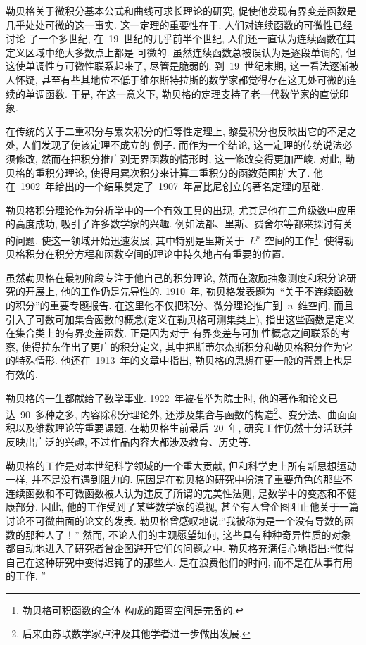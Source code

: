 勒贝格关于微积分基本公式和曲线可求长理论的研究, 促使他发现有界变差函数是几乎处处可微的这一事实.
这一定理的重要性在于: 人们对连续函数的可微性已经讨论
了一个多世纪, 在~19~世纪的几乎前半个世纪, 人们还一直认为连续函数在其定义区域中绝大多数点上都是
可微的. 虽然连续函数总被误认为是逐段单调的, 但这使单调性与可微性联系起来了, 尽管是脆弱的. 到~19~世纪末期, 这一看法逐渐被人怀疑, 甚至有些其地位不低于维尔斯特拉斯的数学家都觉得存在这无处可微的连续的单调函数. 于是, 在这一意义下, 勒贝格的定理支持了老一代数学家的直觉印象.

在传统的关于二重积分与累次积分的恒等性定理上, 黎曼积分也反映出它的不足之处, 人们发现了使该定理不成立的
例子. 而作为一个结论, 这一定理的传统说法必须修改, 然而在把积分推广到无界函数的情形时, 这一修改变得更加严峻. 对此, 勒贝格的重积分理论, 使得用累次积分来计算二重积分的函数范围扩大了. 他在~1902~年给出的一个结果奠定了~1907~年富比尼创立的著名定理的基础.

\setcounter{footnote}{0}

勒贝格积分理论作为分析学中的一个有效工具的出现, 尤其是他在三角级数中应用的高度成功, 吸引了许多数学家的兴趣. 例如法都、里斯、费舍尔等都来探讨有关的问题, 使这一领域开始迅速发展, 其中特别是里斯关于~$L^p$~空间的工作\footnote{勒贝格可积函数的全体
构成的距离空间是完备的. }, 使得勒贝格积分在积分方程和函数空间的理论中持久地占有重要的位置.

虽然勒贝格在最初阶段专注于他自己的积分理论, 然而在激励抽象测度和积分论研究的开展上, 他的工作仍是先导性的. 1910~年, 勒贝格发表题为~``关于不连续函数的积分''的重要专题报告. 在这里他不仅把积分、微分理论推广到~$n$~维空间, 而且引入了可数可加集合函数的概念(定义在勒贝格可测集类上), 指出这些函数是定义在集合类上的有界变差函数. 正是因为对于
有界变差与可加性概念之间联系的考察, 使得拉东作出了更广的积分定义, 其中把斯蒂尔杰斯积分和勒贝格积分作为它的特殊情形. 他还在~1913~年的文章中指出, 勒贝格的思想在更一般的背景上也是有效的.

勒贝格的一生都献给了数学事业. 1922~年被推举为院士时, 他的著作和论文已达~90~多种之多, 内容除积分理论外, 还涉及集合与函数的构造\footnote{后来由苏联数学家卢津及其他学者进一步做出发展. }、变分法、曲面面积以及维数理论等重要课题. 在勒贝格生前最后~20~年, 研究工作仍然十分活跃并反映出广泛的兴趣, 不过作品内容大都涉及教育、历史等.

勒贝格的工作是对本世纪科学领域的一个重大贡献, 但和科学史上所有新思想运动一样, 并不是没有遇到阻力的. 原因是在勒贝格的研究中扮演了重要角色的那些不连续函数和不可微函数被人认为违反了所谓的完美性法则, 是数学中的变态和不健康部分. 因此, 他的工作受到了某些数学家的漠视, 甚至有人曾企图阻止他关于一篇讨论不可微曲面的论文的发表. 勒贝格曾感叹地说:``我被称为是一个没有导数的函数的那种人了！''
然而, 不论人们的主观愿望如何, 这些具有种种奇异性质的对象都自动地进入了研究者曾企图避开它们的问题之中. 勒贝格充满信心地指出:``使得自己在这种研究中变得迟钝了的那些人, 是在浪费他们的时间, 而不是在从事有用的工作. ''

